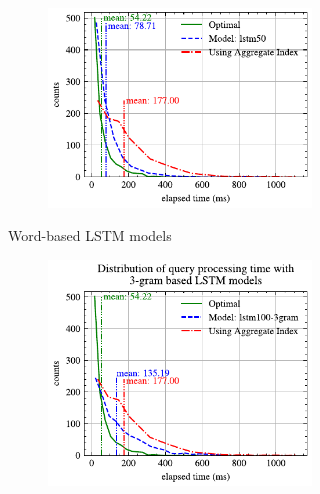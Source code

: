 \documentclass[conference]{IEEEtran}
\begin{document}
\begin{figure}[!th]
\begin{subfigure}{0.45\textwidth}
\begin{subfigure}{\textwidth}
			\includegraphics[]{graphics/perf_dist_lstm50_B.pdf}
		\end{subfigure}
		\caption{Word-based LSTM models}
	\end{subfigure}
	\hfill
	\begin{subfigure}{0.45\textwidth}
		\begin{subfigure}{\textwidth}
			\centering
			\includegraphics[]{graphics/perf_dist_lstm100_3gram_B.pdf}
		\end{subfigure}
		\vfill
		\begin{subfigure}{\textwidth}
			\centering

\end{subfigure}
\end{subfigure}
\end{figure}
\end{document}
